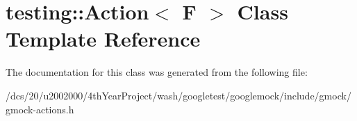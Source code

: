 \hypertarget{classtesting_1_1Action}{}\section{testing\+:\+:Action$<$ F $>$ Class Template Reference}
\label{classtesting_1_1Action}


The documentation for this class was generated from the following file\+:\begin{DoxyCompactItemize}
\item 
/dcs/20/u2002000/4th\+Year\+Project/wash/googletest/googlemock/include/gmock/gmock-\/actions.\+h\end{DoxyCompactItemize}
